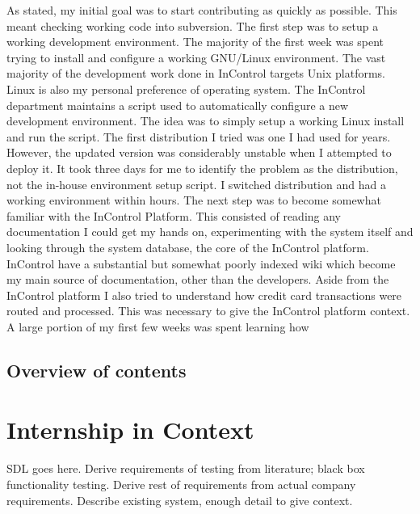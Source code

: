 \documentclass[a4paper, 11pt, titlepage]{article}
\begin{document}
As stated, my initial goal was to start contributing as quickly as possible. This meant checking working code into subversion. The first step was to setup a working development environment.  
The majority of the first week was spent trying to install and configure a working GNU/Linux environment. The vast majority of the development work done in InControl targets Unix platforms. Linux is also my personal preference of operating system. The InControl department maintains a script used to automatically configure a new development environment. The idea was to simply setup a working Linux install and run the script. The first distribution I tried was one I had used for years. However, the updated version was considerably unstable when I attempted to deploy it. It took three days for me to identify the problem as the distribution, not the in-house environment setup script. I switched distribution and had a working environment within hours. The next step was to become somewhat familiar with the InControl Platform. This consisted of reading any documentation I could get my hands on, experimenting with the system itself and looking through the system database, the core of the InControl platform. 
InControl have a substantial but somewhat poorly indexed wiki which become my main source of documentation, other than the developers. Aside from the InControl platform I also tried to understand how credit card transactions were routed and processed. This was necessary to give the InControl platform context. 
A large portion of my first few weeks was spent learning how  
 
\subsection{Overview of contents} 
 
 
\section{Internship in Context} 
SDL goes here. Derive requirements of testing from literature; black box functionality testing. Derive rest of requirements from actual company requirements. Describe existing system, enough detail to give context. 
 
\end{document}
